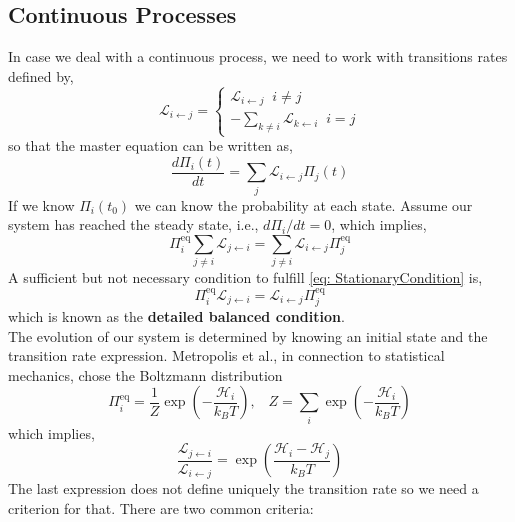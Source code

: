 \subsection{Continuous Processes}
In case we deal with a continuous process, we need to work with transitions rates defined by,
\begin{equation}
    \mathcal{L}_{i \leftarrow j} = 
    \begin{cases}
    \mathcal{L}_{i \leftarrow j} \;\; i\neq j\\
    -\sum_{k\neq i}\mathcal{L}_{k \leftarrow i} \;\; i = j
    \end{cases}
\end{equation}
so that the master equation can be written as,
\begin{equation}
\label{eq: MasterEquationContinuous}
    \frac{d\Pi_{i}(t)}{dt} = \sum_{j}\mathcal{L}_{i \leftarrow j} \Pi_{j}(t)
\end{equation}
If we know $\Pi_{i}(t_{0})$ we can know the probability at each state. Assume our system has reached the steady state, i.e., $d\Pi_{i}/dt = 0$, which implies,
\begin{equation}
\label{eq: StationaryCondition}
    \Pi_{i}^{\mathrm{eq}} \sum_{j\neq i} \mathcal{L}_{j \leftarrow i} = \sum_{j \neq i}\mathcal{L}_{i \leftarrow j}\Pi_{j}^{\mathrm{eq}} 
\end{equation}
A sufficient but not necessary condition to fulfill \ref{eq: StationaryCondition} is,
\begin{equation}
    \Pi_{i}^{\mathrm{eq}}\mathcal{L}_{j \leftarrow i} = \mathcal{L}_{i \leftarrow j}\Pi_{j}^{\mathrm{eq}} 
\end{equation}
which is known as the \textbf{detailed balanced condition}.\\
The evolution of our system is determined by knowing an initial state and the transition rate expression. Metropolis et al., in connection to statistical mechanics, chose the Boltzmann distribution
\begin{equation}
    \Pi_{i}^{\mathrm{eq}} = \frac{1}{Z}\exp\left(- \frac{\mathcal{H}_{i}}{k_{B}T}\right), \;\;\; Z = \sum_{i}\exp\left(-\frac{\mathcal{H}_{i}}{k_{B}T}\right)
\end{equation}
which implies,
\begin{equation}
    \frac{\mathcal{L}_{j \leftarrow i}}{\mathcal{L}_{i \leftarrow j}} = \exp\left(\frac{\mathcal{H}_{i} - \mathcal{H}_{j}}{k_{B}T}\right)
\end{equation}
The last expression does not define uniquely the transition rate so we need a criterion for that. There are two common criteria:
